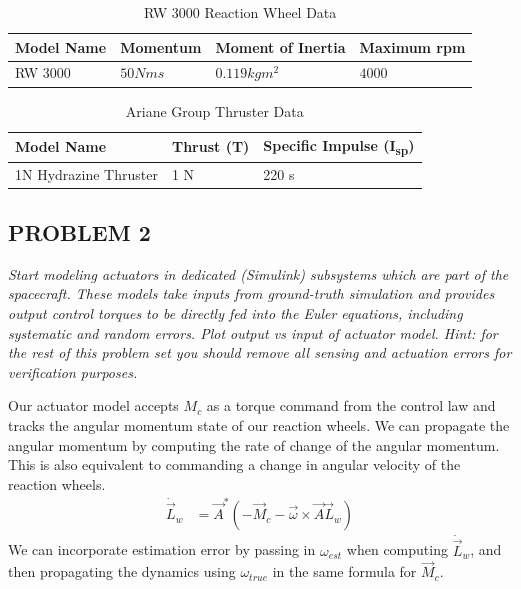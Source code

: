 \begin{table}[H]
\centering
\caption{RW 3000 Reaction Wheel Data \cite{RW3000Datasheet}}
\label{tab:reaction_wheel_data}
\begin{tabular}{|l|l|l|l|}
\hline
Model Name & Momentum     & Moment of Inertia    & Maximum rpm \\ \hline
RW 3000    & $50 N m s$   & $0.119 kg m^2$       & $4000$        \\ \hline
\end{tabular}
\end{table}

\begin{table}[H]
\centering
\caption{Ariane Group Thruster Data}
\label{tab:reaction_thruster}
\begin{tabular}{|l|l|l|}
\hline
Model Name              & Thrust (T)    & Specific Impulse (I\textsubscript{sp})\\ \hline
1N Hydrazine Thruster   & 1 N           & 220 s \\ \hline
\end{tabular}
\end{table}



\subsection{PROBLEM 2}
\textit{Start modeling actuators in dedicated (Simulink) subsystems which are part of the spacecraft. These models take inputs from ground-truth simulation and provides output control torques to be directly fed into the Euler equations, including systematic and random errors. Plot output vs input of actuator model. Hint: for the rest of this problem set you should remove all sensing and actuation errors for verification purposes.}

Our actuator model accepts $M_{c}$ as a torque command from the control law and tracks the angular momentum state of our reaction wheels. We can propagate the angular momentum by computing the rate of change of the angular momentum. This is also equivalent to commanding a change in angular velocity of the reaction wheels.
\begin{align*}
    \Dot{\Vec{L}}_{w} &= \Vec{A}^{*} (-\Vec{M}_{c} - \Vec{\omega} \times \Vec{A} \Vec{L}_{w})
\end{align*}
We can incorporate estimation error by passing in $\omega_{est}$ when computing $\Dot{\Vec{L}}_{w}$, and then propagating the dynamics using $\omega_{true}$ in the same formula for $\Vec{M}_{c}$.

